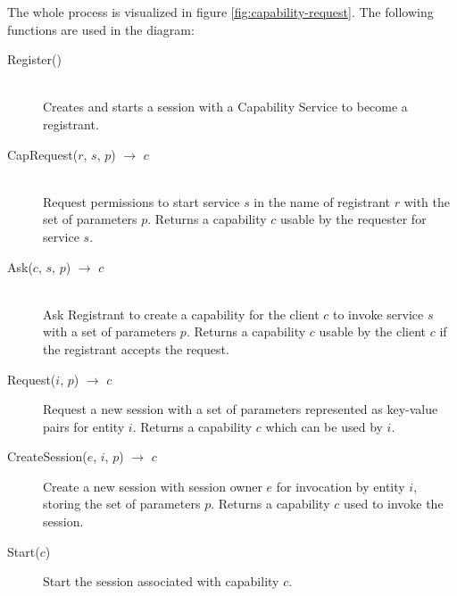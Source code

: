 The whole process is visualized in figure \ref{fig:capability-request}.
The following functions are used in the diagram:
\begin{description}
    \item[Register()]\hfill\\
        Creates and starts a session with a Capability Service to become a registrant.
    \item[CapRequest($r$, $s$, $p$) $\rightarrow$ $c$]\hfill\\
        Request permissions to start service $s$ in the name of registrant $r$ with the set of parameters $p$.
        Returns a capability $c$ usable by the requester for service $s$.
    \item[Ask($c$, $s$, $p$) $\rightarrow$ $c$]\hfill\\
        Ask Registrant to create a capability for the client $c$ to invoke service $s$ with a set of parameters $p$.
        Returns a capability $c$ usable by the client $c$ if the registrant accepts the request.
    \item[Request($i$, $p$) $\rightarrow$ $c$]
        Request a new session with a set of parameters represented as key-value pairs for entity $i$.
        Returns a capability $c$ which can be used by $i$.
    \item[CreateSession($e$, $i$, $p$) $\rightarrow$ $c$]
        Create a new session with session owner $e$ for invocation by entity $i$, storing the set of parameters $p$.
        Returns a capability $c$ used to invoke the session.
    \item[Start($c$)]
        Start the session associated with capability $c$.
\end{description}

